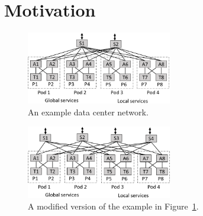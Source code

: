 \documentclass{sig-alternate-10pt}
\begin{document}


%
%
%
%

\section{Motivation}
\label{sec:motivation}

\begin{figure}[t!]
  \centering
  \includegraphics[width=2.5in]{figures/example}
  \caption{An example data center network.}
  \label{fig:example}
  \vspace{-1em}
\end{figure}

\begin{figure}[t!]
  \centering
  \includegraphics[width=2.5in]{figures/example2}
  \caption{A modified version of the example in Figure~\ref{fig:example}.}
  \label{fig:example2}
  \vspace{-1em}
\end{figure}
\end{document}
